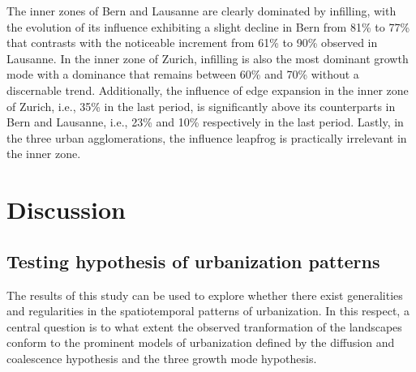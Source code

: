 The inner zones of Bern and Lausanne are clearly dominated by infilling, with the evolution of its influence exhibiting a slight decline in Bern from 81\% to 77\% that contrasts with the noticeable increment from 61\% to 90\% observed in Lausanne.
In the inner zone of Zurich, infilling is also the most dominant growth mode with a dominance that remains between 60\% and 70\% without a discernable trend. Additionally, the influence of edge expansion in the inner zone of Zurich, i.e., 35\% in the last period, is significantly above its counterparts in Bern and Lausanne, i.e., 23\% and 10\% respectively in the last period. %
Lastly, in the three urban agglomerations, the influence leapfrog is practically irrelevant in the inner zone.


\section*{Discussion}

\subsection*{Testing hypothesis of urbanization patterns}

The results of this study can be used to explore whether there exist generalities and regularities in the spatiotemporal patterns of urbanization.
In this respect, a central question is to what extent the observed tranformation of the landscapes conform to the prominent models of urbanization defined by the diffusion and coalescence hypothesis and the three growth mode hypothesis.

